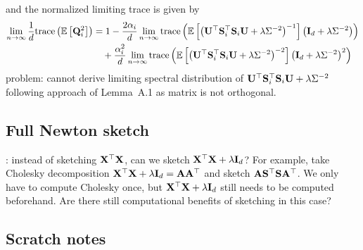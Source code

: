 \documentclass[10pt]{article}
\begin{document}
and the normalized limiting trace is given by
\begin{align*}
\lim_{n\rightarrow\infty}\frac{1}{d}\mathrm{trace}\left(\mathbb{E}\left[\mathbf{Q}_i^2\right]\right) &= 1 - \frac{2\alpha_i}{d}\lim_{n\rightarrow\infty}\mathrm{trace}\left(\mathbb{E}\left[\left(\mathbf{U}^\top\mathbf{S}_i^\top\mathbf{S}_i\mathbf{U} + \lambda\Sigma^{-2}\right)^{-1}\right]\left(\mathbf{I}_d + \lambda\Sigma^{-2}\right)\right) \\
&\quad + \frac{\alpha_i^2}{d}\lim_{n\rightarrow\infty}\mathrm{trace}\left(\mathbb{E}\left[\left(\mathbf{U}^\top\mathbf{S}_i^\top\mathbf{S}_i\mathbf{U} + \lambda\Sigma^{-2}\right)^{-2}\right]\left(\mathbf{I}_d + \lambda\Sigma^{-2}\right)^2\right)
\end{align*}
\todo problem: cannot derive limiting spectral distribution of $\mathbf{U}^\top\mathbf{S}_i^\top\mathbf{S}_i\mathbf{U} + \lambda\Sigma^{-2}$ following approach of Lemma~A.1 as matrix is not orthogonal.


\subsection{Full Newton sketch}

\todo: instead of sketching $\mathbf{X}^\top\mathbf{X}$, can we sketch $\mathbf{X}^\top\mathbf{X}+\lambda\mathbf{I}_d$? For example, take Cholesky decomposition $\mathbf{X}^\top\mathbf{X}+\lambda\mathbf{I}_d = \mathbf{A}\mathbf{A}^\top$ and sketch $\mathbf{A}\mathbf{S}^\top\mathbf{S}\mathbf{A}^\top$. We only have to compute Cholesky once, but $\mathbf{X}^\top\mathbf{X}+\lambda\mathbf{I}_d$ still needs to be computed beforehand. Are there still computational benefits of sketching in this case?


\subsection{Scratch notes}
\end{document}
